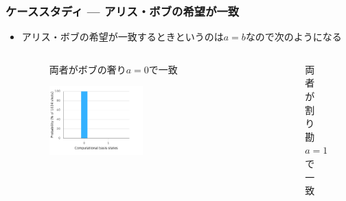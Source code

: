 \begin{frame}
  \frametitle{ケーススタディ --- アリス・ボブの希望が一致}

  \begin{itemize}
    \item アリス・ボブの希望が一致するときというのは$a = b$なので次のようになる
    \begin{columns}
      \begin{column}{0.5\textwidth}
        \begin{figure}
          \centering
          \vspace{2ex}
          \caption{両者がボブの奢り$a = 0$で一致}
          \label{fig:a_equal_0}
        \end{figure}

        \begin{figure}
          \includegraphics[width=0.5\textwidth]{./img/a_0_histogram.pdf}
        \end{figure}
      \end{column}
      \begin{column}{0.5\textwidth}
        \begin{figure}
          \centering
          \vspace{2ex}
          \caption{両者が割り勘$a = 1$で一致}
          \label{fig:a_equal_1}
        \end{figure}


\end{column}
\end{columns}
\end{itemize}
\end{frame}
